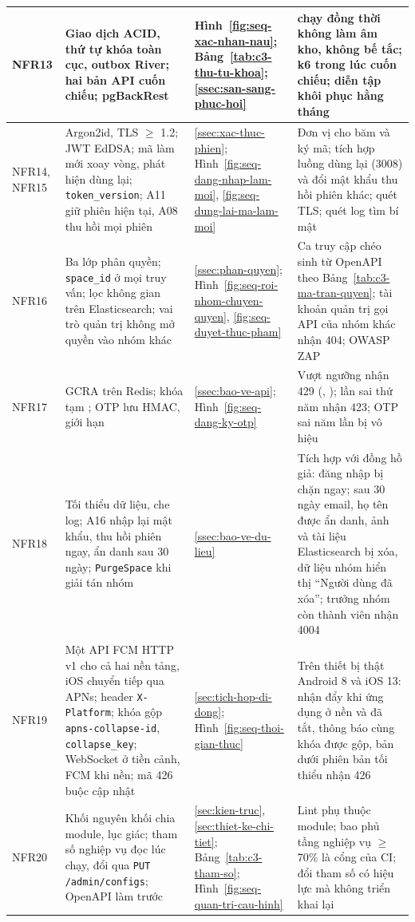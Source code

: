{\begin{longtable}{|L{1.35cm}|L{5.3cm}|L{2.3cm}|L{\dimexpr{}\arrayrulewidth-8.95cm\relax}|}
NFR13 & Giao dịch ACID, thứ tự khóa toàn cục, outbox River; hai bản API cuốn chiếu; pgBackRest & Hình~\ref{fig:seq-xac-nhan-nau}; Bảng~\ref{tab:c3-thu-tu-khoa}; \ref{ssec:san-sang-phuc-hoi} &  chạy đồng thời không làm âm kho, không bế tắc; k6 trong lúc cuốn chiếu; diễn tập khôi phục hằng tháng\\ \hline
NFR14, NFR15 & Argon2id, TLS $\ge$ 1.2; JWT EdDSA; mã làm mới xoay vòng, phát hiện dùng lại; \texttt{token\_version}; A11 giữ phiên hiện tại, A08 thu hồi mọi phiên & \ref{ssec:xac-thuc-phien}; Hình~\ref{fig:seq-dang-nhap-lam-moi}, \ref{fig:seq-dung-lai-ma-lam-moi} & Đơn vị cho băm và ký mã; tích hợp luồng dùng lại (3008) và đổi mật khẩu thu hồi phiên khác; quét TLS; quét log tìm bí mật\\ \hline
NFR16 & Ba lớp phân quyền; \texttt{space\_id} ở mọi truy vấn; lọc không gian trên Elasticsearch; vai trò quản trị không mở quyền vào nhóm khác & \ref{ssec:phan-quyen}; Hình~\ref{fig:seq-roi-nhom-chuyen-quyen}, \ref{fig:seq-duyet-thuc-pham} & Ca truy cập chéo sinh từ OpenAPI theo Bảng~\ref{tab:c3-ma-tran-quyen}; tài khoản quản trị gọi API của nhóm khác nhận 404; OWASP ZAP\\ \hline
NFR17 & GCRA trên Redis; khóa tạm ; OTP lưu HMAC, giới hạn  & \ref{ssec:bao-ve-api}; Hình~\ref{fig:seq-dang-ky-otp} & Vượt ngưỡng nhận 429 (, ); lần sai thứ năm nhận 423; OTP sai năm lần bị vô hiệu\\ \hline
NFR18 & Tối thiểu dữ liệu, che log; A16 nhập lại mật khẩu, thu hồi phiên ngay, ẩn danh sau 30 ngày; \texttt{PurgeSpace} khi giải tán nhóm & \ref{ssec:bao-ve-du-lieu} & Tích hợp với đồng hồ giả: đăng nhập bị chặn ngay; sau 30 ngày email, họ tên được ẩn danh, ảnh và tài liệu Elasticsearch bị xóa, dữ liệu nhóm hiển thị “Người dùng đã xóa”; trưởng nhóm còn thành viên nhận 4004\\ \hline
NFR19 & Một API FCM HTTP v1 cho cả hai nền tảng, iOS chuyển tiếp qua APNs; header \texttt{X-Platform}; khóa gộp \texttt{apns-collapse-id}, \texttt{collapse\_key}; WebSocket ở tiền cảnh, FCM khi nền; mã 426 buộc cập nhật & \ref{sec:tich-hop-di-dong}; Hình~\ref{fig:seq-thoi-gian-thuc} & Trên thiết bị thật Android 8 và iOS 13: nhận đẩy khi ứng dụng ở nền và đã tắt, thông báo cùng khóa được gộp, bản dưới phiên bản tối thiểu nhận 426\\ \hline
NFR20 & Khối nguyên khối chia module, lục giác; tham số nghiệp vụ đọc lúc chạy, đổi qua \texttt{PUT /admin/configs}; OpenAPI làm trước & \ref{sec:kien-truc}, \ref{sec:thiet-ke-chi-tiet}; Bảng~\ref{tab:c3-tham-so}; Hình~\ref{fig:seq-quan-tri-cau-hinh} & Lint phụ thuộc module; bao phủ tầng nghiệp vụ $\ge$ 70\% là cổng của CI; đổi tham số có hiệu lực mà không triển khai lại\\ \hline

\end{longtable}}
